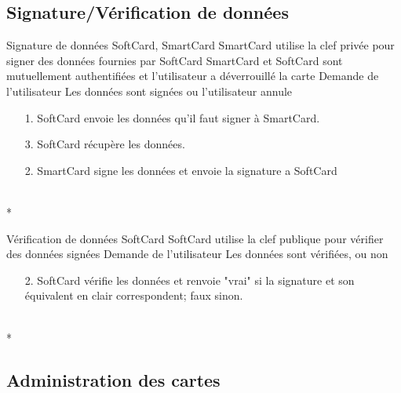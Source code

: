 \documentclass[a4paper,11pt,french]{article}
\begin{document}
\subsection{Signature/Vérification de données}

\fiche
{Signature de données}
	{SoftCard, SmartCard}
    {SmartCard utilise la clef privée pour signer des données fournies par 
    SoftCard}
    { SmartCard et SoftCard sont mutuellement authentifiées et l'utilisateur a
    déverrouillé la carte}
    {Demande de l'utilisateur}
    {Les données sont signées ou l'utilisateur annule}
    {\begin{itemize}
        \item[]
        \item[1.] SoftCard envoie les données qu'il faut signer à SmartCard.
        \item[3.] SoftCard récupère les données.
    \end{itemize}}
	{\begin{itemize}
        \item[]
        \item[2.] SmartCard signe les données et envoie la signature a SoftCard 
	\end{itemize}
	}
	{}
\flots
    {}
    {}
\\*

\fiche
{Vérification de données}
	{SoftCard}
    {SoftCard utilise la clef publique pour vérifier des données signées}
    {}
    {Demande de l'utilisateur}
    {Les données sont vérifiées, ou non}
    {\begin{itemize}
        \item[]
        \item[2.] SoftCard vérifie les données et renvoie "vrai" si la signature
            et son équivalent en clair correspondent; faux sinon.
    \end{itemize}}
	{\begin{itemize}
        \item[]
	\end{itemize}
	}
	{}
\flots
    {}
    {}
\\*


\subsection{Administration des cartes}
\end{document}
